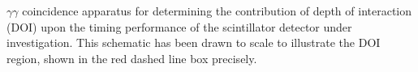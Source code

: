 \label{fig:doi-ctr} $\gamma\gamma$ coincidence apparatus for determining the contribution of depth of interaction (DOI) upon the timing performance of the scintillator detector under investigation.
This schematic has been drawn to scale to illustrate the DOI region, shown in the red dashed line box precisely.
